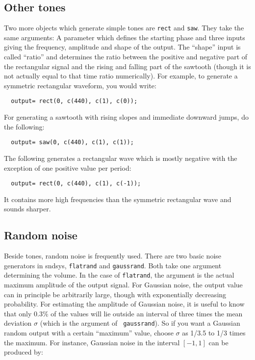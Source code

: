 \documentclass{article}
\def\sn{{\sc sndsys}}
\def\bv{\begin{verbatim}}
\begin{document}
\subsection{Other tones}

Two more objects which generate simple tones are {\tt rect} and {\tt saw}.
They take the same arguments: A parameter which defines the starting phase
and three inputs giving the frequency, amplitude and shape of the output.  The
``shape'' input is called ``ratio'' and determines the ratio between the 
positive and negative part of the rectangular signal and the rising and falling
part of the sawtooth (though it is not actually equal to that time ratio
numerically).  For example, to generate a symmetric rectangular waveform, you
would write:

\bv
  output= rect(0, c(440), c(1), c(0));
\end{verbatim}

For generating a sawtooth with rising slopes and immediate downward jumps, do
the following:

\bv
  output= saw(0, c(440), c(1), c(1));
\end{verbatim}

The following generates a rectangular wave which is mostly negative with the
exception of one positive value per period:

\bv
  output= rect(0, c(440), c(1), c(-1));
\end{verbatim}

It contains more high frequencies than the symmetric rectangular wave and
sounds sharper.



\subsection{Random noise}
\label{sec:random}

Beside tones, random noise is frequently used.  There are two basic noise
generators in \sn, {\tt flatrand} and {\tt gaussrand}.  Both take one argument
determining the volume.  In the case of {\tt flatrand}, the argument is the
actual maximum amplitude of the output signal.  For Gaussian noise, the output
value can in principle be arbitrarily large, though with exponentially
decreasing probability.  For estimating the amplitude of Gaussian noise, it is
useful to know that only 0.3\% of the values will lie outside an interval of
three times the mean deviation $\sigma$ (which is the argument of {\tt
gaussrand}).  So if you want a Gaussian random output with a certain
``maximum'' value, choose $\sigma$ as 1/3.5 to 1/3 times the maximum.  For
instance, Gaussian noise in the interval $[-1, 1]$ can be produced by:
\end{document}

